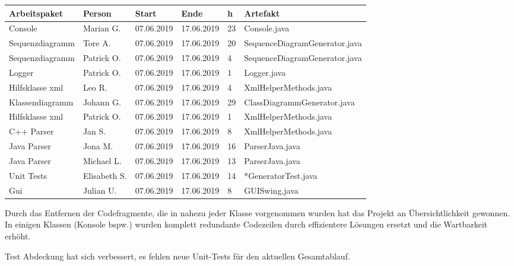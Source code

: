 \begin{longtable}{|p{4cm}|l|l|l|l|l|}
        \hline
        Arbeitspaket & Person & Start & Ende & h & Artefakt\\
        \hline
        Console & Marian G. & 07.06.2019 & 17.06.2019 & 23 & Console.java\\ \hline
        Sequenzdiagramm & Tore A.  & 07.06.2019 & 17.06.2019  &20 & SequenceDiagramGenerator.java \\ \hline
        Sequenzdiagramm & Patrick O.  & 07.06.2019 & 17.06.2019  & 4  & SequenceDiagramGenerator.java \\ \hline
        Logger & Patrick O.  & 07.06.2019 & 17.06.2019  & 1  & Logger.java \\ \hline
        Hilfsklasse xml & Leo R.  & 07.06.2019 & 17.06.2019  & 4  & XmlHelperMethods.java \\ \hline
        Klassendiagramm & Johann G.  & 07.06.2019 & 17.06.2019  & 29 & ClassDiagrammGenerator.java \\ \hline
        Hilfsklasse xml  & Patrick O.  & 07.06.2019 & 17.06.2019  & 1 & XmlHelperMethods.java \\ \hline
        C++ Parser  & Jan S.  & 07.06.2019 & 17.06.2019  & 8 & XmlHelperMethods.java \\ \hline
        Java Parser  & Jona M.  & 07.06.2019 & 17.06.2019  & 16 & ParserJava.java \\ \hline
        Java Parser  & Michael L.  & 07.06.2019 & 17.06.2019  & 13 & ParserJava.java \\ \hline
        Unit Tests  & Elisabeth S.  & 07.06.2019 & 17.06.2019  & 14 & *GeneratorTest.java \\ \hline
        Gui  & Julian U. & 07.06.2019 & 17.06.2019  & 8 & GUISwing.java \\ \hline
\end{longtable}     
\nsecend

Durch das Entfernen der Codefragmente, die in nahezu jeder Klasse vorgenommen wurden hat das Projekt an Übersichtlichkeit gewonnen. In einigen Klassen (Konsole bspw.) wurden komplett redundante Codezeilen durch effizientere Lösungen ersetzt und die Wartbarkeit erhöht.
\nsecend%

Test Abdeckung hat sich verbessert, es fehlen neue Unit-Tests für den aktuellen Gesamtablauf.
\nsecend%

